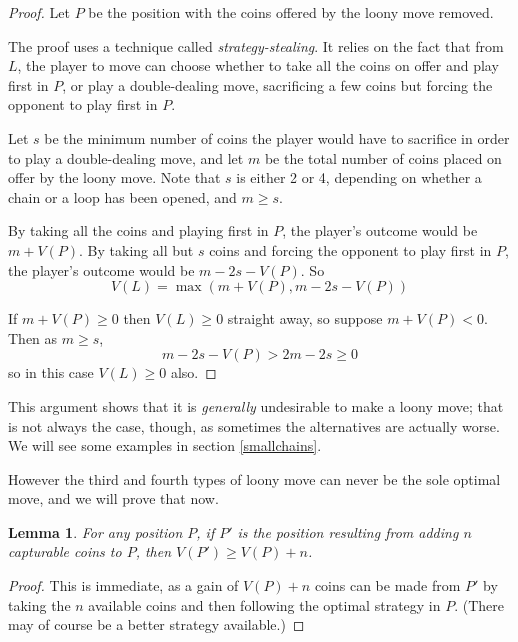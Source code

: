 \documentclass[a4paper,twocolumn]{article}
\newtheorem{addcoins}[thm]{Lemma}
\begin{document}
\begin{proof}
  Let $P$ be the position with the coins offered by the loony move
  removed.

  The proof uses a technique called \emph{strategy-stealing}. It
  relies on the fact that from $L$, the player to move can choose
  whether to take all the coins on offer and play first in $P$, or
  play a double-dealing move, sacrificing a few coins but forcing the
  opponent to play first in $P$.

  Let $s$ be the minimum number of coins the player would have to
  sacrifice in order to play a double-dealing move, and let $m$ be the
  total number of coins placed on offer by the loony move. Note that
  $s$ is either 2 or 4, depending on whether a chain or a loop has
  been opened, and $m \ge s$.

  By taking all the coins and playing first in $P$, the player's
  outcome would be $m + V(P)$. By taking all but $s$ coins and forcing
  the opponent to play first in $P$, the player's outcome would be
  $m-2s-V(P)$. So $$V(L) = \max(m+V(P), m-2s-V(P))$$

  If $m+V(P) \ge 0$ then $V(L) \ge 0$ straight away, so suppose
  $m+V(P) < 0$. Then as $m \ge s$, $$m-2s-V(P) > 2m-2s \ge 0$$ so in
  this case $V(L) \ge 0$ also.
\end{proof}

This argument shows that it is \emph{generally} undesirable to make a
loony move; that is not always the case, though, as sometimes the
alternatives are actually worse. We will see some examples in section
\ref{smallchains}.

However the third and fourth types of loony move can never be the sole
optimal move, and we will prove that now.

\begin{addcoins}\label{addcoins}
  For any position $P$, if $P'$ is the position resulting from adding
  $n$ capturable coins to $P$, then $V(P') \ge V(P)+n$.
\end{addcoins}
\begin{proof}
  This is immediate, as a gain of $V(P)+n$ coins can be made from $P'$
  by taking the $n$ available coins and then following the optimal
  strategy in $P$. (There may of course be a better strategy
  available.)
\end{proof}
\end{document}
